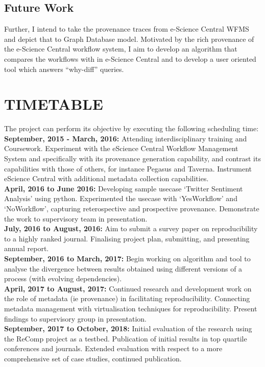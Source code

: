 \documentclass[6pt,,a4paper]{article}
\begin{document}
\subsection{\textbf{Future Work}}
Further, I intend to take the provenance traces from e-Science Central WFMS and depict that to Graph Database model. Motivated by the rich provenance of the e-Science Central workflow system,  I aim to develop an algorithm that compares the workflows with in e-Science Central and to develop a user oriented tool which answers “why-diff” queries.
\newline
\section{\textbf{TIMETABLE}}
The project can perform its objective by executing the following scheduling time:
\\
\break \textbf{September, 2015 - March, 2016: }
Attending interdisciplinary training and Coursework. Experiment with the eScience Central Workflow Management System and specifically with its provenance generation capability, and contrast its capabilities with those of others, for instance Pegasus and Taverna. Instrument eScience Central with additional metadata collection capabilities. 
\\
\break \textbf{April, 2016 to June 2016: }
Developing sample usecase ‘Twitter Sentiment Analysis’ using python. Experimented the usecase with ‘YesWorkflow’ and ‘NoWorkflow’, capturing reterospective and prospective provenance. Demonstrate the work to supervisory team in presentation.
\\
\break \textbf{July, 2016 to August, 2016: }
Aim to submit a survey paper on reproducibility to a highly ranked journal. Finalising project plan, submitting, and presenting annual report. 
\\
\break \textbf{September, 2016 to March, 2017: }
Begin working on algorithm and tool to analyse the divergence between results obtained using different versions of a process (with evolving dependencies). 
\\
\break \textbf{April, 2017 to August, 2017: }
Continued research and development work on the role of metadata (ie provenance) in facilitating reproducibility. Connecting metadata management with virtualisation techniques for reproducibility. Present findings to supervisory group in presentation.
\\
\break \textbf{September, 2017 to October, 2018: }
Initial evaluation of the research using the ReComp project as a testbed. Publication of initial results in top quartile conferences and journals. Extended evaluation with respect to a more comprehensive set of case studies, continued publication. 
\end{document}
